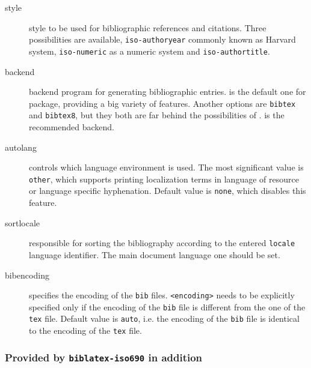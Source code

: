 \documentclass[a4paper,10pt]{ltxdockit}
\def\t|#1|{\texttt{#1}}
\newcommand*{\biber}{\sty{biber}\xspace}
\newcommand*{\biblatex}{\sty{biblatex}\xspace}
\begin{document}
\begin{description}
\item[style] style to be used for bibliographic references and citations.
Three possibilities are available, \t|iso-authoryear| commonly known as
Harvard system, \t|iso-numeric| as a numeric system and \t|iso-authortitle|.

\item[backend] backend program for generating bibliographic entries. \biber
is the default one for \biblatex package, providing a big variety
of features. Another options are \t|bibtex| and \t|bibtex8|, but they both
are far behind the possibilities of \biber. \biber is the recommended backend.

\item[autolang] controls which language environment is used. The most
significant value is \t|other|, which supports printing localization
terms in language of resource or language specific hyphenation. Default
value is \t|none|, which disables this feature.

\item[sortlocale] responsible for sorting the bibliography according to the
entered \t|locale| language identifier. The main document language one should
be set.

\item[bibencoding] specifies the encoding of the \t|bib| files. \t|<encoding>|
needs to be explicitly specified only if the encoding of the \t|bib| file
is different from the one of the \t|tex| file. Default value is \t|auto|, i.e.
the encoding of the \t|bib| file is identical to the encoding of the \t|tex|
file.
\end{description}

\subsubsection{Provided by \t|biblatex-iso690| in addition}
\end{document}

